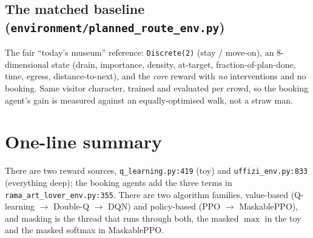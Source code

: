 \documentclass[11pt]{article}
\newcommand{\file}[1]{\texttt{\small #1}}
\newcommand{\co}[1]{\texttt{\small #1}}
\begin{document}
\subsection{The matched baseline (\file{environment/planned\_route\_env.py})}

The fair ``today's museum'' reference: \co{Discrete(2)} (stay / move-on), an
$8$-dimensional state (drain, importance, density, at-target, fraction-of-plan-done,
time, egress, distance-to-next), and the \emph{core} reward with \emph{no} interventions
and no booking. Same visitor character, trained and evaluated per crowd, so the booking
agent's gain is measured against an equally-optimised walk, not a straw man.

\section*{One-line summary}
\noindent
There are two reward sources, \file{q\_learning.py:419} (toy) and
\file{uffizi\_env.py:833} (everything deep); the booking agents add the three terms in
\file{rama\_art\_lover\_env.py:355}. There are two algorithm families, value-based
(Q-learning $\to$ Double-Q $\to$ DQN) and policy-based (PPO $\to$ MaskablePPO), and
masking is the thread that runs through both, the masked $\max$ in the toy and the masked
softmax in MaskablePPO.
\end{document}
